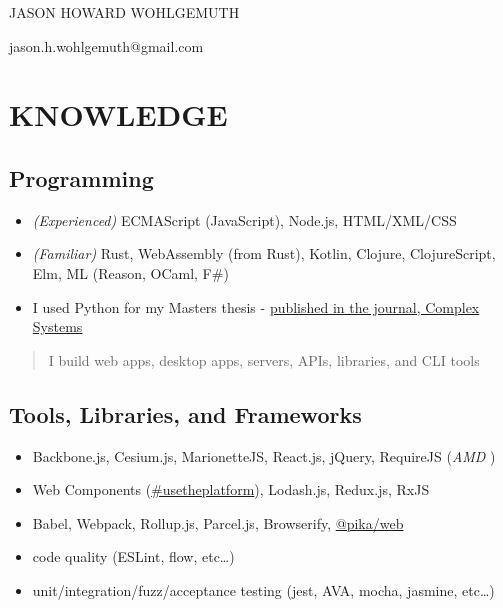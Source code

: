 \documentclass[10pt]{article}
\def\tightlist{}
\begin{document}
\begin{center}\Huge {JASON HOWARD WOHLGEMUTH}\end{center}
\begin{center}jason.h.wohlgemuth@gmail.com\end{center}

\hypertarget{knowledge}{%
\section{KNOWLEDGE}\label{knowledge}}

\hypertarget{programming}{%
\subsection{Programming}\label{programming}}

\begin{itemize}
\tightlist
\item
  \emph{(Experienced)} ECMAScript (JavaScript), Node.js, HTML/XML/CSS
\item
  \emph{(Familiar)} Rust, WebAssembly (from Rust), Kotlin, Clojure,
  ClojureScript, Elm, ML (Reason, OCaml, F\#)
\item
  I used Python for my Masters thesis -
  \href{https://www.complex-systems.com/abstracts/v23_i03_a01/}{published
  in the journal, Complex Systems}
\end{itemize}

\begin{quote}
I build web apps, desktop apps, servers, APIs, libraries, and CLI tools
\end{quote}

\hypertarget{tools-libraries-and-frameworks}{%
\subsection{Tools, Libraries, and
Frameworks}\label{tools-libraries-and-frameworks}}

\begin{itemize}
\tightlist
\item
  Backbone.js, Cesium.js, MarionetteJS, React.js, jQuery, RequireJS
  (\emph{AMD })
\item
  Web Components
  (\href{https://twitter.com/hashtag/usetheplatform?src=hash}{\#usetheplatform}),
  Lodash.js, Redux.js, RxJS
\item
  Babel, Webpack, Rollup.js, Parcel.js, Browserify,
  \href{https://www.pika.dev/blog/pika-web-a-future-without-webpack/}{@pika/web}
\item
  code quality (ESLint, flow, etc\ldots)
\item
  unit/integration/fuzz/acceptance testing (jest, AVA, mocha, jasmine,
  etc\ldots)
\end{itemize}
\end{document}

